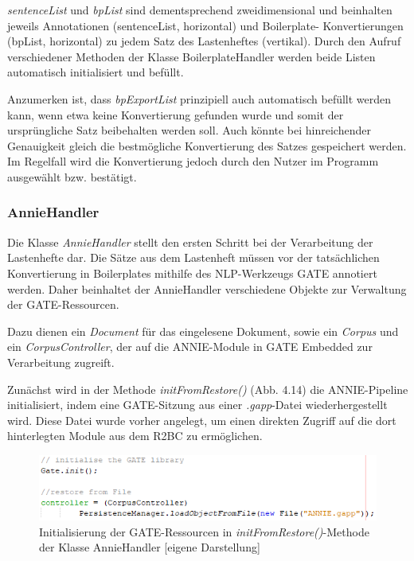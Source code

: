 \documentclass[12pt]{report}
\begin{document}
\textit{sentenceList} und \textit{bpList} sind dementsprechend zweidimensional und beinhalten jeweils Annotationen (sentenceList, horizontal) und Boilerplate- Konvertierungen (bpList, horizontal) zu jedem Satz des Lastenheftes (vertikal). 
Durch den Aufruf verschiedener Methoden der Klasse BoilerplateHandler werden beide Listen automatisch initialisiert und befüllt.

Anzumerken ist, dass \textit{bpExportList} prinzipiell auch automatisch befüllt werden kann, wenn etwa keine Konvertierung gefunden wurde und somit der ursprüngliche Satz beibehalten werden soll. Auch könnte bei hinreichender Genauigkeit gleich die bestmögliche Konvertierung des Satzes gespeichert werden. Im Regelfall wird die Konvertierung jedoch durch den Nutzer im Programm ausgewählt bzw. bestätigt.

\subsubsection{AnnieHandler}
Die Klasse \textit{AnnieHandler} stellt den ersten Schritt bei der Verarbeitung der Lastenhefte dar. Die Sätze aus dem Lastenheft müssen vor der tatsächlichen Konvertierung in Boilerplates mithilfe des NLP-Werkzeugs GATE annotiert werden.
Daher beinhaltet der AnnieHandler verschiedene Objekte zur Verwaltung der GATE-Ressourcen. 

Dazu dienen ein \textit{Document} für das eingelesene Dokument, sowie ein \textit{Corpus} und ein \textit{CorpusController}, der auf die ANNIE-Module in GATE Embedded zur Verarbeitung zugreift.

Zunächst wird in der Methode \textit{initFromRestore()} (Abb. 4.14) die ANNIE-Pipeline initialisiert, indem eine GATE-Sitzung aus einer \textit{.gapp}-Datei wiederhergestellt wird. Diese Datei wurde vorher angelegt, um einen direkten Zugriff auf die dort hinterlegten Module aus dem R2BC zu ermöglichen.

\begin{figure}[h!]
\begin{center}
\includegraphics[scale=1]{Bilder/AnnieHandler-initFromRestore.png}
\caption{Initialisierung der GATE-Ressourcen in \textit{initFromRestore()}-Methode der Klasse AnnieHandler [eigene Darstellung]}
\end{center}
\end{figure}
\end{document}
